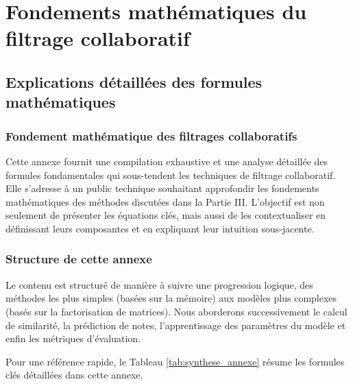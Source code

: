 \chapter{Fondements mathématiques du filtrage collaboratif}
\label{annexe:formules_maths}

\section{Explications détaillées des formules mathématiques}

\subsection{Fondement mathématique des filtrages collaboratifs}
Cette annexe fournit une compilation exhaustive et une analyse détaillée des formules fondamentales qui sous-tendent les techniques de filtrage collaboratif. Elle s'adresse à un public technique souhaitant approfondir les fondements mathématiques des méthodes discutées dans la Partie III. L'objectif est non seulement de présenter les équations clés, mais aussi de les contextualiser en définissant leurs composantes et en expliquant leur intuition sous-jacente.

\subsection{Structure de cette annexe}
Le contenu est structuré de manière à suivre une progression logique, des méthodes les plus simples (basées sur la mémoire) aux modèles plus complexes (basés sur la factorisation de matrices). Nous aborderons successivement le calcul de similarité, la prédiction de notes, l'apprentissage des paramètres du modèle et enfin les métriques d'évaluation.

Pour une référence rapide, le Tableau \ref{tab:synthese_annexe} résume les formules clés détaillées dans cette annexe.

